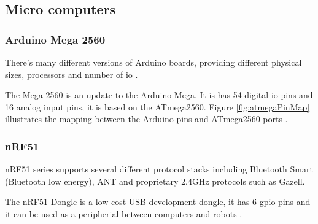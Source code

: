 \subsection{Micro computers}
\subsubsection{Arduino Mega 2560}
There's many different versions of Arduino boards, providing different physical sizes, processors and number of \acrfull{io} \cite{arduinoboards}. 

The Mega 2560 is an update to the Arduino Mega. It is has 54 digital \acrshort{io} pins and 16 analog input pins, it is based on the ATmega2560. Figure \ref{fig:atmegaPinMap} illustrates the mapping between the Arduino pins and ATmega2560 ports \cite{arduinomega2560}. 


\subsubsection{nRF51}
nRF51 series supports several different protocol stacks including Bluetooth Smart (Bluetooth low energy), ANT and proprietary 2.4GHz protocols such as Gazell. 

The nRF51 Dongle is a low-cost USB development dongle, it has 6 \acrfull{gpio} pins and it can be used as a peripherial between computers and robots \cite{nrf51Dongle}.


